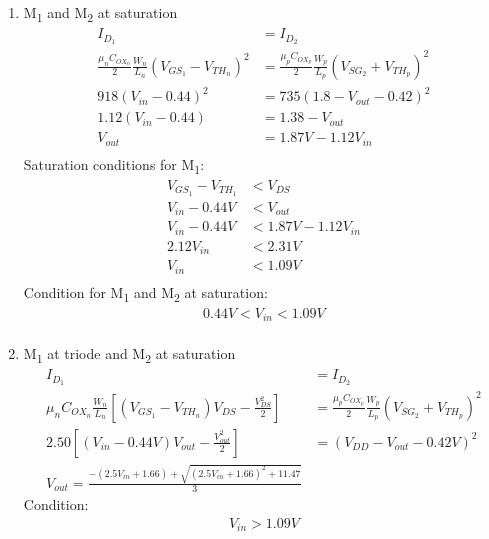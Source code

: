 \documentclass{article}
\begin{document}
\begin{enumerate}
\begin{enumerate}
\item M\textsubscript{1} and M\textsubscript{2} at saturation
\begin{equation*}
\begin{aligned}
I_{D_{1}} &= I_{D_{2}} \\
\frac{\mu_{n}C_{OX_{n}}}{2}\frac{W_{n}}{L_{n}}(V_{GS_{1}} - V_{TH_{n}})^{2} &=
\frac{\mu_{p}C_{OX_{p}}}{2}\frac{W_{p}}{L_{p}}(V_{SG_{2}} + V_{TH_{p}})^{2} \\
918(V_{in} - 0.44)^{2} &= 735(1.8 - V_{out} - 0.42)^{2} \\
1.12(V_{in} - 0.44) &= 1.38 - V_{out} \\
V_{out} &= 1.87V - 1.12V_{in} \\
\end{aligned}
\end{equation*}
Saturation conditions for M\textsubscript{1}:
\begin{equation*}
\begin{aligned}
V_{GS_{1}} - V_{TH_{1}} &< V_{DS} \\
V_{in} - 0.44V &< V_{out} \\
V_{in} - 0.44V &< 1.87V - 1.12V_{in} \\
2.12V_{in} &< 2.31V \\
V_{in} &< 1.09V \\
\end{aligned}
\end{equation*}
Condition for M\textsubscript{1} and M\textsubscript{2} at saturation:
\begin{equation*}
\begin{aligned}
0.44V < V_{in} < 1.09V \\
\end{aligned}
\end{equation*}

\item M\textsubscript{1} at triode and M\textsubscript{2} at saturation
\begin{equation*}
\begin{aligned}
I_{D_{1}} &= I_{D_{2}} \\
\mu_{n}C_{OX_{n}}\frac{W_{n}}{L_{n}}[(V_{GS_{1}} - V_{TH_{n}})V_{DS} - \frac{V_{DS}^2}{2}] &=
\frac{\mu_{p}C_{OX_{p}}}{2}\frac{W_{p}}{L_{p}}(V_{SG_{2}} + V_{TH_{p}})^{2} \\
2.50[(V_{in} - 0.44V)V_{out} - \frac{V_{out}^2}{2}] &= (V_{DD} - V_{out} - 0.42V)^{2} \\
V_{out} = \frac{-(2.5V_{in} + 1.66) + \sqrt{(2.5V_{in} + 1.66)^{2} +11.47}}{3}
\end{aligned}
\end{equation*}
Condition:
\begin{equation*}
\begin{aligned}
V_{in} > 1.09V \\
\end{aligned}
\end{equation*}
\end{enumerate}


\end{enumerate}
\end{document}
